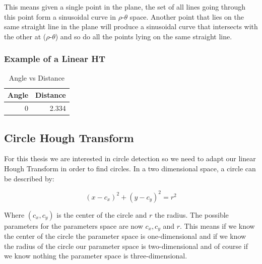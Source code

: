 \documentclass[11pt,twoside]{scrreprt}
\begin{document}
This means given a single point in the plane, the set of all lines going through this point form a sinusoidal curve in $\rho\text{-}\theta$ space. Another point 
that lies on the same straight line in the plane will produce a sinusoidal curve that intersects with the other at ($\rho\text{-}\theta$) and so do all the points lying on the same straight line. 

\subsubsection{Example of a Linear HT} %
\label{ssub:example_of_a_linear_ht}
  
\begin{table}
\centering
\caption{Angle vs Distance}
\begin{tabular}{rr}
\toprule
 Angle & Distance \\
\midrule
0 & 2.334 \\
\bottomrule
\end{tabular}
\end{table}



\subsection{Circle Hough Transform} %
\label{sub:circle_hough_transform}

For this thesis we are interested in circle detection so we need to adapt our linear Hough Transform in order to find circles. In a two dimensional space, a circle can be described by:

\begin{equation}
		(x-c_x)^2 + (y-c_y)^2 = r^2
\end{equation}

Where $(c_x,c_y)$ is the center of the circle and $r$ the radius. The possible parameters for the parameters space are now $c_x, c_y$ and $r$. This means if we know the center of the circle the parameter space is one-dimensional and if we know the radius of the circle our parameter space is two-dimensional and of course if we know nothing the parameter space is three-dimensional.
\end{document}
